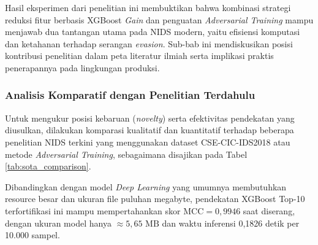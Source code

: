 \documentclass[11pt, a4paper]{article}
\begin{document}
Hasil eksperimen dari penelitian ini membuktikan bahwa kombinasi strategi reduksi fitur berbasis XGBoost \textit{Gain} dan penguatan \textit{Adversarial Training} mampu menjawab dua tantangan utama pada NIDS modern, yaitu efisiensi komputasi dan ketahanan terhadap serangan \textit{evasion}. Sub-bab ini mendiskusikan posisi kontribusi penelitian dalam peta literatur ilmiah serta implikasi praktis penerapannya pada lingkungan produksi.

\subsubsection{Analisis Komparatif dengan Penelitian Terdahulu}
Untuk mengukur posisi kebaruan (\textit{novelty}) serta efektivitas pendekatan yang diusulkan, dilakukan komparasi kualitatif dan kuantitatif terhadap beberapa penelitian NIDS terkini yang menggunakan dataset CSE-CIC-IDS2018 atau metode \textit{Adversarial Training}, sebagaimana disajikan pada Tabel \ref{tab:sota_comparison}.

\begin{table}[htbp]
\caption{Komparasi Hasil Penelitian dengan Literatur Terkait}
\label{tab:sota_comparison}
\centering
\vspace{0.2cm}
\end{table}

Dibandingkan dengan model \textit{Deep Learning} yang umumnya membutuhkan resource besar dan ukuran file puluhan megabyte, pendekatan XGBoost Top-10 terfortifikasi ini mampu mempertahankan skor $\text{MCC} = 0{,}9946$ saat diserang, dengan ukuran model hanya $\approx 5{,}65\text{ MB}$ dan waktu inferensi 0,1826 detik per 10.000 sampel.
\end{document}
